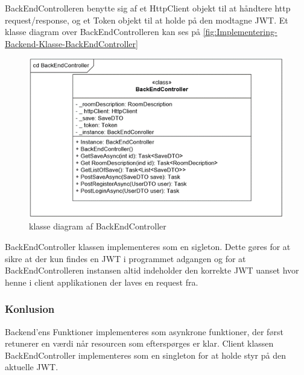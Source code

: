 BackEndControlleren benytte sig af et HttpClient objekt til at håndtere http request/response, og et Token objekt til at holde på den modtagne JWT.
Et klasse diagram over BackEndControlleren kan ses på \autoref{fig:Implementering-Backend-Klasse-BackEndController}\\

\begin{figure}[H]
\centering
\includegraphics[width = \textwidth]{02-Body/Images/Backend_klasse_BackEndController.PNG}
\caption{klasse diagram af BackEndController}
\label{fig:Implementering-Backend-Klasse-BackEndController}
\end{figure}

BackEndController klassen implementeres som en sigleton. Dette gøres for at sikre at der kun findes en JWT i programmet adgangen og for at BackEndControlleren instansen altid indeholder den korrekte JWT uanset hvor henne i client applikationen der laves en request fra.\\


\subsubsection{Konlusion}

Backend'ens Funktioner implementeres som asynkrone funktioner, der først retunerer en værdi når resourcen som efterspørges er klar. Client klassen BackEndController implementeres som en singleton for at holde styr på den aktuelle JWT.

\newpage
